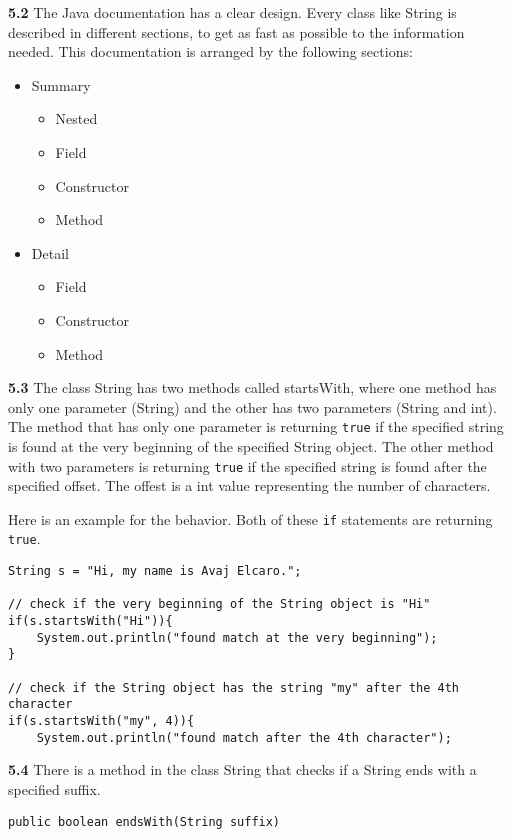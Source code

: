 \textbf{5.2} The Java documentation has a clear design. Every class like 
String is described in different sections, to get as fast as possible to the
information needed. This documentation is arranged by the following 
sections:

\begin{itemize}
	\item Summary
	\begin{itemize}
		\item Nested
		\item Field
		\item Constructor
		\item Method
	\end{itemize}
	\item Detail
	\begin{itemize}
		\item Field
		\item Constructor
		\item Method
	\end{itemize}
\end{itemize}

\textbf{5.3} The class String has two methods called startsWith, where
one method has only one parameter (String) and the other has two parameters
(String and int).
The method that has only one parameter is returning \lstinline{true} if the
specified string is found at the very beginning of the specified String
object.
The other method with two parameters is returning \lstinline{true} if the
specified string is found after the specified offset. The offest is a
int value representing the number of characters.

Here is an example for the behavior. Both of these \lstinline{if} statements
are returning \lstinline{true}.

\begin{lstlisting}
String s = "Hi, my name is Avaj Elcaro.";

// check if the very beginning of the String object is "Hi"
if(s.startsWith("Hi")){
	System.out.println("found match at the very beginning");
}

// check if the String object has the string "my" after the 4th character
if(s.startsWith("my", 4)){
	System.out.println("found match after the 4th character");
\end{lstlisting}

\textbf{5.4} There is a method in the class String that checks if a 
String ends with a specified suffix.

\begin{lstlisting}
public boolean endsWith(String suffix)
\end{lstlisting}

